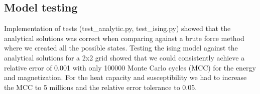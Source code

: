 \subsection{Model testing}

Implementation of tests (test_analytic.py, test_ising.py) showed that the
analytical solutions was correct when comparing against a brute force method
where we created all the possible states. Testing the ising model against the
analytical solutions for a 2x2 grid showed that we could consistently achieve a
relative error of 0.001 with only 100000 Monte Carlo cycles (MCC) for the energy
and magnetization. For the heat capacity and susceptibility we had to increase
the MCC to 5 millions and the relative error tolerance to 0.05.
